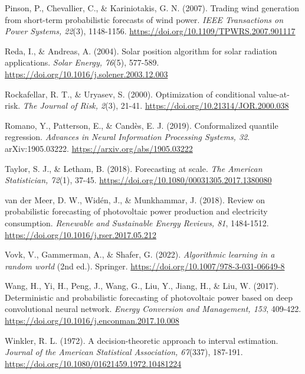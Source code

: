 \documentclass[11pt,a4paper,oneside]{report}
\begin{document}
Pinson, P., Chevallier, C., \& Kariniotakis, G. N. (2007). Trading wind generation from short-term probabilistic forecasts of wind power. \emph{IEEE Transactions on Power Systems, 22}(3), 1148-1156. \href{https://doi.org/10.1109/TPWRS.2007.901117}{https://doi.org/10.1109/TPWRS.2007.901117}

Reda, I., \& Andreas, A. (2004). Solar position algorithm for solar radiation applications. \emph{Solar Energy, 76}(5), 577-589. \href{https://doi.org/10.1016/j.solener.2003.12.003}{https://doi.org/10.1016/j.solener.2003.12.003}

Rockafellar, R. T., \& Uryasev, S. (2000). Optimization of conditional value-at-risk. \emph{The Journal of Risk, 2}(3), 21-41. \href{https://doi.org/10.21314/JOR.2000.038}{https://doi.org/10.21314/JOR.2000.038}

Romano, Y., Patterson, E., \& Cand\`es, E. J. (2019). Conformalized quantile regression. \emph{Advances in Neural Information Processing Systems, 32}. arXiv:1905.03222. \href{https://arxiv.org/abs/1905.03222}{https://arxiv.org/abs/1905.03222}

Taylor, S. J., \& Letham, B. (2018). Forecasting at scale. \emph{The American Statistician, 72}(1), 37-45. \href{https://doi.org/10.1080/00031305.2017.1380080}{https://doi.org/10.1080/00031305.2017.1380080}

van der Meer, D. W., Wid\'en, J., \& Munkhammar, J. (2018). Review on probabilistic forecasting of photovoltaic power production and electricity consumption. \emph{Renewable and Sustainable Energy Reviews, 81}, 1484-1512. \href{https://doi.org/10.1016/j.rser.2017.05.212}{https://doi.org/10.1016/j.rser.2017.05.212}

Vovk, V., Gammerman, A., \& Shafer, G. (2022). \emph{Algorithmic learning in a random world} (2nd ed.). Springer. \href{https://doi.org/10.1007/978-3-031-06649-8}{https://doi.org/10.1007/978-3-031-06649-8}

Wang, H., Yi, H., Peng, J., Wang, G., Liu, Y., Jiang, H., \& Liu, W. (2017). Deterministic and probabilistic forecasting of photovoltaic power based on deep convolutional neural network. \emph{Energy Conversion and Management, 153}, 409-422. \href{https://doi.org/10.1016/j.enconman.2017.10.008}{https://doi.org/10.1016/j.enconman.2017.10.008}

Winkler, R. L. (1972). A decision-theoretic approach to interval estimation. \emph{Journal of the American Statistical Association, 67}(337), 187-191. \href{https://doi.org/10.1080/01621459.1972.10481224}{https://doi.org/10.1080/01621459.1972.10481224}
\end{document}
